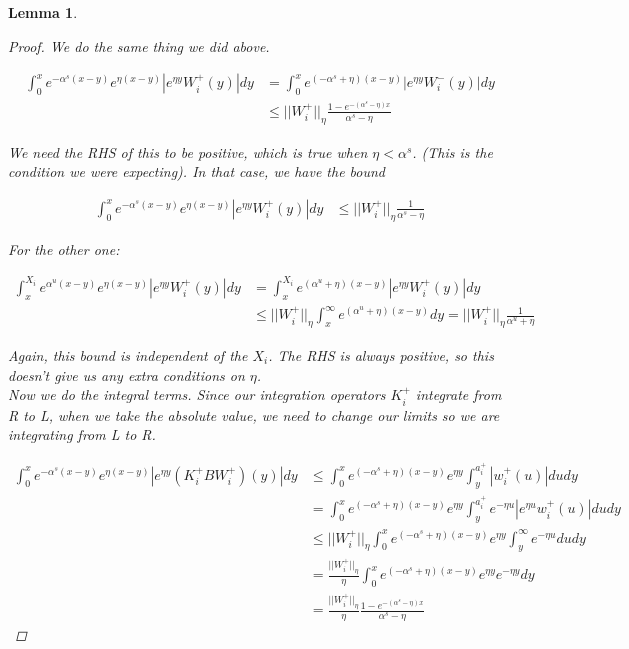 \documentclass[12pt]{article}
\newtheorem{lemma}{Lemma}
\begin{document}
\begin{lemma}
\begin{proof}
We do the same thing we did above.

\begin{align*}
\int_0^x e^{-\alpha^s (x-y)}e^{\eta(x-y)}|e^{\eta y} W_i^+(y)| dy &= \int_0^x e^{(-\alpha^s + \eta) (x-y)}|e^{\eta y} W_i^-(y)| dy \\
&\leq ||W_i^+||_\eta \frac{1 - e^{-(\alpha^s - \eta)x} }{\alpha^s - \eta}
\end{align*}

We need the RHS of this to be positive, which is true when $\eta < \alpha^s$. (This is the condition we were expecting). In that case, we have the bound

\begin{align*}
\int_0^x e^{-\alpha^s (x-y)}e^{\eta(x-y)}|e^{\eta y} W_i^+(y)| dy &\leq ||W_i^+||_\eta \frac{1}{\alpha^s - \eta}
\end{align*}

For the other one:

\begin{align*}
\int_x^{X_i} e^{\alpha^u (x-y)}e^{\eta(x-y)}|e^{\eta y} W_i^+(y)| dy &= \int_x^{X_i} e^{(\alpha^u + \eta) (x-y)}|e^{\eta y} W_i^+(y)| dy \\
&\leq ||W_i^+||_\eta \int_x^{\infty} e^{(\alpha^u + \eta) (x-y)} dy = ||W_i^+||_\eta \frac{1}{\alpha^u + \eta}
\end{align*}

Again, this bound is independent of the $X_i$. The RHS is always positive, so this doesn't give us any extra conditions on $\eta$. \\

Now we do the integral terms. Since our integration operators $K_i^+$ integrate from R to L, when we take the absolute value, we need to change our limits so we are integrating from L to R.

\begin{align*}
\int_0^x e^{-\alpha^s (x-y)}e^{\eta(x-y)}|e^{\eta y} (K_i^+ B W_i^+)(y)| dy &\leq \int_0^x e^{(-\alpha^s + \eta)(x-y)}e^{\eta y} \int_y^{a_i^+} |w_i^+(u)| du dy \\
&= \int_0^x e^{(-\alpha^s + \eta)(x-y)}e^{\eta y} \int_y^{a_i^+} e^{-\eta u} |e^{\eta u} w_i^+(u)| du dy \\
&\leq ||W_i^+||_\eta \int_0^x e^{(-\alpha^s + \eta)(x-y)}e^{\eta y} \int_y^\infty e^{-\eta u} du dy \\
&= \frac{||W_i^+||_\eta}{\eta} \int_0^x e^{(-\alpha^s + \eta)(x-y)}e^{\eta y} e^{-\eta y} dy \\
&= \frac{||W_i^+||_\eta}{\eta} \frac{1 - e^{-(\alpha^s - \eta)x}}{\alpha^s - \eta} 
\end{align*}


\end{proof}
\end{lemma}
\end{document}

